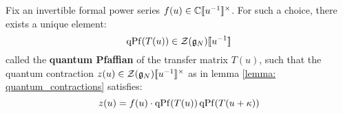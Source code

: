             \begin{lemma} \label{lemma: quantum_pfaffians}
                Fix an invertible formal power series $f(u) \in \bbC[\![u^{-1}]\!]^{\x}$. For such a choice, there exists a unique element:
                    $$\operatorname{qPf}( T(u) ) \in \mathcal{Z}(\mathfrak{g}_N)[\![u^{-1}]\!]$$
                called the \textbf{quantum Pfaffian} of the transfer matrix $T(u)$, such that the quantum contraction $z(u) \in \calZ(\g_N)[\![u^{-1}]\!]^{\x}$ as in lemma \ref{lemma: quantum_contractions} satisfies:
                    \begin{equation} \label{equation: quantum_pfaffians}
                        z(u) = f(u) \cdot \operatorname{qPf}( T(u) ) \operatorname{qPf}( T(u + \kappa) )
                    \end{equation}
            \end{lemma}
